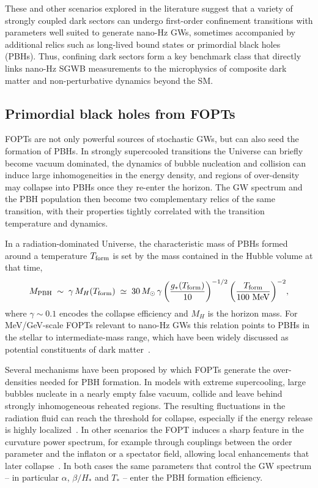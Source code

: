 \documentclass[a4paper,11pt]{article}
\begin{document}
These and other scenarios explored in the literature suggest that a variety of strongly coupled dark sectors can undergo 
first-order confinement transitions with parameters well suited to generate nano-Hz GWs, sometimes accompanied by 
additional relics such as long-lived bound states or primordial black holes (PBHs). Thus, confining dark sectors form 
a key benchmark class that directly links nano-Hz SGWB measurements to the microphysics of composite dark matter 
and non-perturbative dynamics beyond the SM.

\subsection{Primordial black holes from FOPTs}
\label{sec:pbh}

FOPTs are not only powerful sources of stochastic GWs, but can also seed the formation of PBHs. In strongly supercooled
transitions the Universe can briefly become vacuum dominated, the dynamics of bubble nucleation and collision can induce 
large inhomogeneities in the energy density, and regions of over-density may collapse into PBHs once they re-enter 
the horizon. The GW spectrum and the PBH population then become two complementary relics of the same transition, 
with their properties tightly correlated with the transition temperature and dynamics.

In a radiation-dominated Universe, the characteristic mass of PBHs formed around a temperature $T_{\rm form}$ is set 
by the mass contained in the Hubble volume at that time,
\begin{equation}
  M_{\rm PBH} \;\sim\; \gamma\, M_H(T_{\rm form})
  \;\simeq\;
  30\,M_\odot\,\gamma
  \left(\frac{g_*(T_{\rm form})}{10}\right)^{-1/2}
  \left(\frac{T_{\rm form}}{100~{\rm MeV}}\right)^{-2}\!,
  \label{eq:MPBH-scaling}
\end{equation}
where $\gamma\sim 0.1$ encodes the collapse efficiency and $M_H$ is the horizon mass. For MeV/GeV-scale FOPTs 
relevant to nano-Hz GWs this relation points to PBHs in the stellar to intermediate-mass range, which have been 
widely discussed as potential constituents of dark matter~\citep{Carr:2020PBHReview,Sasaki:2016jop}.

Several mechanisms have been proposed by which FOPTs generate the over-densities needed for PBH formation. 
In models with extreme supercooling, large bubbles nucleate in a nearly empty false vacuum, collide and leave 
behind strongly inhomogeneous reheated regions. The resulting fluctuations in the radiation fluid can reach 
the threshold for collapse, especially if the energy release is highly localized~\citep{Lewicki:2024SlowPT,Gouttenoire:2024PBH}.
In other scenarios the FOPT induces a sharp feature in the curvature power spectrum, for example through couplings 
between the order parameter and the inflaton or a spectator field, allowing local enhancements that later
collapse~\citep{Liu:2021svg,Gouttenoire:2023rxy,Gouttenoire:2023ftt}. In both cases the same parameters 
that control the GW spectrum -- in particular $\alpha$, $\beta/H_*$ and $T_*$ -- enter the PBH formation efficiency.
\end{document}
